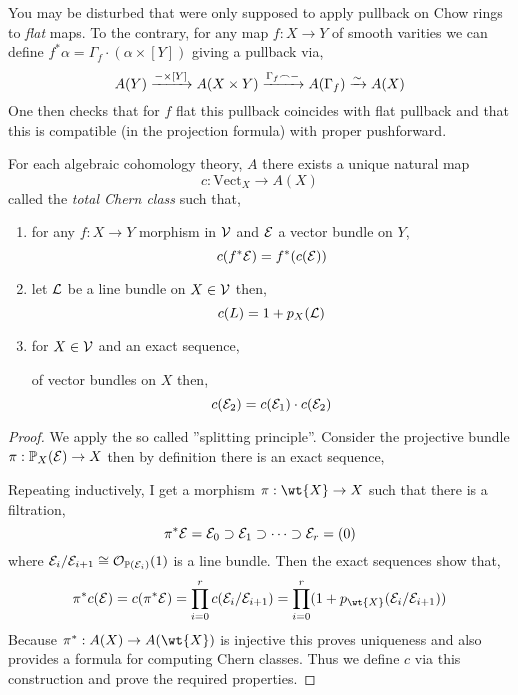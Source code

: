 \documentclass[12pt]{article}
\begin{document}
\begin{rmk}
You may be disturbed that were only supposed to apply pullback on Chow rings to \textit{flat} maps. To the contrary, for any map $f : X \to Y$ of smooth varities we can define $f^* \alpha = \Gamma_f \cdot (\alpha \times [Y])$ giving a pullback via,
\[ A(Y) \xrightarrow{- \times [Y]} A(X \times Y) \xrightarrow{\Gamma_f \frown -} A(\Gamma_f) \xrightarrow{\sim} A(X) \]
One then checks that for $f$ flat this pullback coincides with flat pullback and that this is compatible (in the projection formula) with proper pushforward.
\end{rmk}

\begin{thm}
For each algebraic cohomology theory, $A$ there exists a unique natural map \[ c : \mathrm{Vect}_X \to A(X) \]
called the \textit{total Chern class} such that,
\begin{enumerate}
\item for any $f : X \to Y$ morphism in $\mathcal{V}$ and $\mathcal{E}$ a vector bundle on $Y$,
\[ c(f^* \mathcal{E}) = f^*(c(\mathcal{E})) \]
\item let $\mathcal{L}$ be a line bundle on $X \in \mathcal{V}$ then,
\[ c(L) = 1 + p_X(\mathcal{L}) \]
\item for $X \in \mathcal{V}$ and an exact sequence,
\begin{center}
\end{center}
of vector bundles on $X$ then,
\[ c(\mathcal{E}_2) = c(\mathcal{E}_1) \cdot c(\mathcal{E}_2) \]
\end{enumerate}
\end{thm}

\begin{proof}
We apply the so called ''splitting principle''. Consider the projective bundle $\pi : \mathbb{P}_X(\mathcal{E}) \to X$ then by definition there is an exact sequence,
\begin{center}
\end{center}
Repeating inductively, I get a morphism $\pi : \wt{X} \to X$ such that there is a filtration,
\[ \pi^* \mathcal{E} = \mathcal{E}_0 \supset \mathcal{E}_1 \supset \cdots \supset \mathcal{E}_r = (0) \]
where $\mathcal{E}_i / \mathcal{E}_{i+1} \cong \mathcal{O}_{\mathbb{P}(\mathcal{E}_i)}(1)$ is a line bundle. Then the exact sequences show that,
\[ \pi^* c(\E) = c(\pi^* \E) = \prod_{i = 0}^r c(\E_i / \E_{i+1}) = \prod_{i = 0}^r (1 + p_{\wt{X}}(\E_i/\E_{i+1})) \]
Because $\pi^* : A(X) \to A(\wt{X})$ is injective this proves uniqueness and also provides a formula for computing Chern classes. Thus we define $c$ via this construction and prove the required properties.
\end{proof}
\end{document}
